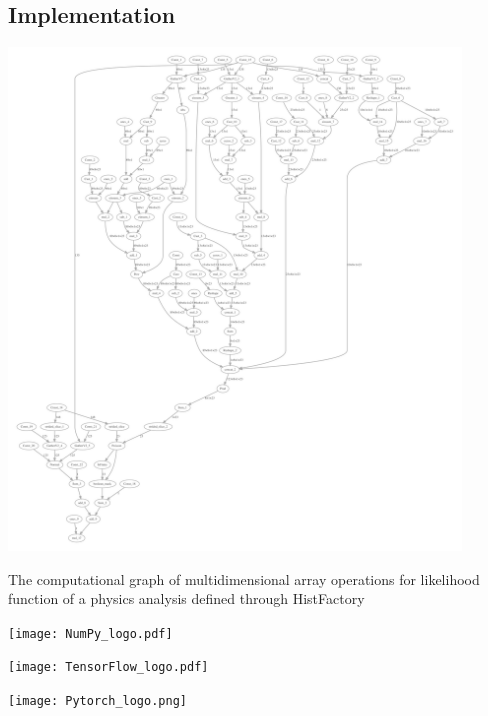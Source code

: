 \documentclass[a0paper,fleqn]{betterposter}
\begin{document}
{ \subsection{Implementation}
 \begin{center}
  \includegraphics[width=0.9\textwidth]{computational_graph3.pdf}
 \end{center}
 The computational graph of multidimensional array operations for likelihood function of a physics analysis defined through HistFactory

 \vspace{0.5em}
 \begin{minipage}{0.33\textwidth}
  \begin{center}
   \texttt{[image: NumPy\_logo.pdf]}
  \end{center}
 \end{minipage}%
 \quad
 \begin{minipage}{0.33\textwidth}
  \begin{center}
   \texttt{[image: TensorFlow\_logo.pdf]}
  \end{center}
 \end{minipage}%
 \quad
 \begin{minipage}{0.33\textwidth}
  \begin{center}
   \texttt{[image: Pytorch\_logo.png]}
  \end{center}
 \end{minipage}%
 \vspace{0.5em}

}
\end{document}
